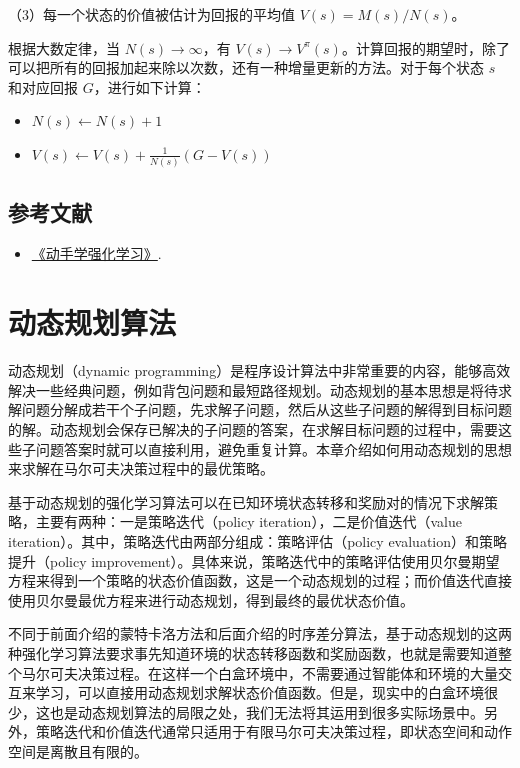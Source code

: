 （3）每一个状态的价值被估计为回报的平均值 \(V(s)=M(s)/N(s)\)。

根据大数定律，当 \(N(s)\to\infty\)，有 \(V(s)\to V^\pi(s)\)。计算回报的期望时，除了可以把所有的回报加起来除以次数，还有一种增量更新的方法。对于每个状态 \(s\) 和对应回报 \(G\)，进行如下计算：

\begin{itemize}
\tightlist
\item
  \(N(s)\leftarrow N(s)+1\)
\item
  \(V(s)\leftarrow V(s)+\frac{1}{N(s)}(G-V(s))\)
\end{itemize}

\hypertarget{ux53c2ux8003ux6587ux732e-44}{%
\subsection{参考文献}\label{ux53c2ux8003ux6587ux732e-44}}

\begin{itemize}
\tightlist
\item
  \href{https://hrl.boyuai.com/}{《动手学强化学习》}.
\end{itemize}

\clearpage

\hypertarget{ux52a8ux6001ux89c4ux5212ux7b97ux6cd5}{%
\section{动态规划算法}\label{ux52a8ux6001ux89c4ux5212ux7b97ux6cd5}}

动态规划（dynamic programming）是程序设计算法中非常重要的内容，能够高效解决一些经典问题，例如背包问题和最短路径规划。动态规划的基本思想是将待求解问题分解成若干个子问题，先求解子问题，然后从这些子问题的解得到目标问题的解。动态规划会保存已解决的子问题的答案，在求解目标问题的过程中，需要这些子问题答案时就可以直接利用，避免重复计算。本章介绍如何用动态规划的思想来求解在马尔可夫决策过程中的最优策略。

基于动态规划的强化学习算法可以在已知环境状态转移和奖励对的情况下求解策略，主要有两种：一是策略迭代（policy iteration），二是价值迭代（value iteration）。其中，策略迭代由两部分组成：策略评估（policy evaluation）和策略提升（policy improvement）。具体来说，策略迭代中的策略评估使用贝尔曼期望方程来得到一个策略的状态价值函数，这是一个动态规划的过程；而价值迭代直接使用贝尔曼最优方程来进行动态规划，得到最终的最优状态价值。

不同于前面介绍的蒙特卡洛方法和后面介绍的时序差分算法，基于动态规划的这两种强化学习算法要求事先知道环境的状态转移函数和奖励函数，也就是需要知道整个马尔可夫决策过程。在这样一个白盒环境中，不需要通过智能体和环境的大量交互来学习，可以直接用动态规划求解状态价值函数。但是，现实中的白盒环境很少，这也是动态规划算法的局限之处，我们无法将其运用到很多实际场景中。另外，策略迭代和价值迭代通常只适用于有限马尔可夫决策过程，即状态空间和动作空间是离散且有限的。

